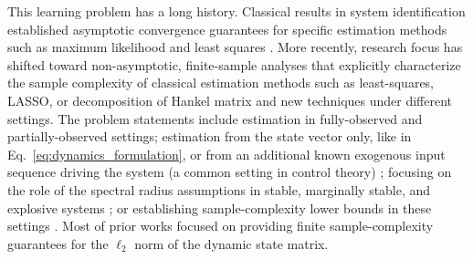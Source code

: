 \documentclass[11pt]{article}
\begin{document}
This learning problem has a long history. Classical results in system identification  established asymptotic convergence guarantees for specific estimation methods such as maximum likelihood and least squares \cite{ljung1976consistency1, ljung1976consistency2, goodwin1977dynamic, ljung1987theory}. More recently, research focus has shifted toward non-asymptotic, finite-sample analyses that explicitly characterize the sample complexity of classical estimation methods such as least-squares, LASSO, or decomposition of Hankel matrix and new techniques under different settings. The problem statements include estimation in fully-observed \cite{faradonbeh2018finite, sarkar2019near,jedra2020finite,tyagi2023convex,Bento2010learning,nardi2011autoregressive,song2011large,kock2015oracle} and partially-observed \cite{oymak2021revisiting, simchowitz2018learning, sarkar2021finite, tsiamis2019finite, bakshi2023new} settings; estimation from the state vector only, like in Eq.~\eqref{eq:dynamics_formulation}, or from an additional known exogenous input sequence driving the system (a common setting in control theory) \cite{oymak2021revisiting,sarkar2021finite,tsiamis2019finite,bakshi2023new}; focusing on the role of the spectral radius assumptions in stable, marginally stable, and explosive systems \cite{faradonbeh2018finite, sarkar2019near,jedra2020finite,simchowitz2018learning, tsiamis2019finite, bakshi2023new}; or establishing sample-complexity lower bounds in these settings \cite{jedra2019lowerbound}. Most of prior works focused on providing finite sample-complexity guarantees for the $\ell_2$ norm of the dynamic state matrix.
\end{document}

